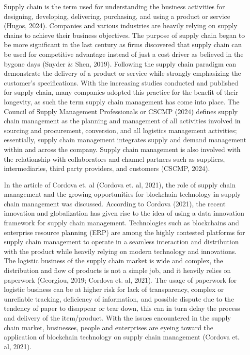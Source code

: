 Supply chain is the term used for understanding the business activities for designing, developing, delivering, purchasing, and using a product or service (Hugos, 2024). Companies and various industries are heavily relying on supply chains to achieve their business objectives. The purpose of supply chain began to be more significant in the last century as firms discovered that supply chain can be used for competitive advantage instead of just a cost driver as believed in the bygone days (Snyder \& Shen, 2019). Following the supply chain paradigm can demonstrate the delivery of a product or service while strongly emphasizing the customer’s specifications. With the increasing studies conducted and published for supply chain, many companies adopted this practice for the benefit of their longevity,  as such the term supply chain management has come into place. The Council of Supply Management Professionals or CSCMP (2024) defines supply chain management as the planning and management of all activities involved in sourcing and procurement, conversion, and all logistics management activities; essentially, supply chain management integrates supply and demand management within and across the company. Supply chain management is also involved with the relationship with collaborators and channel partners such as suppliers, intermediaries, third party providers, and customers (CSCMP, 2024).

In the article of Cordova et. al (Cordova et. al, 2021), the role of supply chain management and the growing opportunities for blockchain technology in supply chain management was discussed. According to Cordova (2021), the recent innovation and globalization has given rise to the idea of using a data innovation framework for supply chain management. Technologies such as blockchains and enterprise resource planning (ERP) are among the highly contested platforms for supply chain management to operate in a seamless interaction and distribution with the product while heavily relying on modern technology and innovations. The logistic business of the supply chain market is wide and complex, the distribution and flow of products is not a simple job, and it heavily relies on paperwork (Georgiou, 2019;  Cordova et. al, 2021). The usage of paperwork for logistic business can be at higher risk for lack of transparency, complex or unreliable tracking, deficiency of information, and possible dispute due to the tendency of paper to disappear or tear down, this can in turn delay the process and delivery of the item/product. With the issues encountered in the supply chain market, businesses, people and enterprises are eyeing toward the application of blockchain technology on supply chain management (Cordova et. al, 2021).

